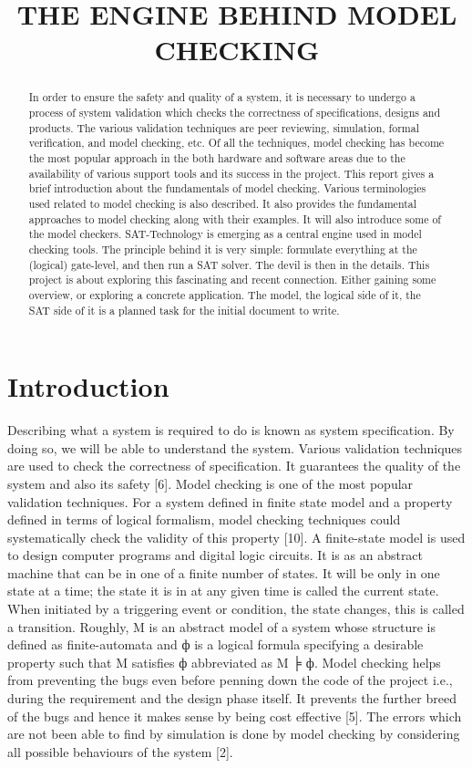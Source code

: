 \documentclass{article}
\begin{document}
\tableofcontents

\title{ THE ENGINE BEHIND MODEL CHECKING}
\maketitle
\begin{abstract}
In order to ensure the safety and quality of a system, it is necessary to undergo a process of system validation which checks the correctness of specifications, designs and products. The various validation techniques are peer reviewing, simulation, formal verification, and model checking, etc. Of all the techniques, model checking has become the most popular approach in the both hardware and software areas due to the availability of various support tools and its success in the project. This report gives a brief introduction about the fundamentals of model checking. Various terminologies used related to model checking is also described. It also provides the fundamental approaches to model checking along with their examples. It will also introduce some of the model checkers. SAT-Technology is emerging as a central engine used in model checking tools. The principle behind it is very simple: formulate everything at the (logical) gate-level, and then run a SAT solver. The devil is then in the details. This project is about exploring this fascinating and recent connection. Either gaining some overview, or exploring a concrete application. The model, the logical side of it, the SAT side of it is a planned task for the initial document to write.

\end{abstract}

\section{Introduction}
Describing what a system is required to do is known as system specification. By doing so, we will be able to understand the system. Various validation techniques are used to check the correctness of specification. It guarantees the quality of the system and also its safety [6]. Model checking is one of the most popular validation techniques. For a system defined in finite state model and a property defined in terms of logical formalism, model checking techniques could systematically check the validity of this property [10]. A finite-state model is used to design computer programs and digital logic circuits. It is as an abstract machine that can be in one of a finite number of states. It will be only in one state at a time; the state it is in at any given time is called the current state. When initiated by a triggering event or condition, the state changes, this is called a transition. 
Roughly, M is an abstract model of a system whose structure is defined as finite-automata and ф is a logical formula specifying a desirable property such that M satisfies ф abbreviated as M ╞ ф. 
Model checking helps from preventing the bugs even before penning down the code of the project i.e., during the requirement and the design phase itself. It prevents the further breed of the bugs and hence it makes sense by being cost effective [5]. The errors which are not been able to find by simulation is done by model checking by considering all possible behaviours of the system [2].  
\end{document}
